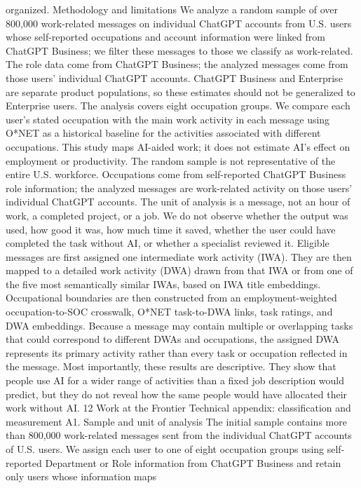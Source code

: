 organized.
Methodology and limitations
We analyze a random sample of over 800,000 work-related messages on individual ChatGPT accounts
from U.S. users whose self-reported occupations and account information were linked from ChatGPT
Business; we filter these messages to those we classify as work-related. The role data come from
ChatGPT Business; the analyzed messages come from those users’ individual ChatGPT accounts.
ChatGPT Business and Enterprise are separate product populations, so these estimates should not be
generalized to Enterprise users. The analysis covers eight occupation groups. We compare each user’s
stated occupation with the main work activity in each message using O*NET as a historical baseline for
the activities associated with different occupations.
This study maps AI-aided work; it does not estimate AI’s effect on employment or productivity. The
random sample is not representative of the entire U.S. workforce. Occupations come from self-reported
ChatGPT Business role information; the analyzed messages are work-related activity on those users’
individual ChatGPT accounts.
The unit of analysis is a message, not an hour of work, a completed project, or a job. We do not observe
whether the output was used, how good it was, how much time it saved, whether the user could have
completed the task without AI, or whether a specialist reviewed it.
Eligible messages are first assigned one intermediate work activity (IWA). They are then mapped
to a detailed work activity (DWA) drawn from that IWA or from one of the five most semantically
similar IWAs, based on IWA title embeddings. Occupational boundaries are then constructed from an
employment-weighted occupation-to-SOC crosswalk, O*NET task-to-DWA links, task ratings, and DWA
embeddings. Because a message may contain multiple or overlapping tasks that could correspond to
different DWAs and occupations, the assigned DWA represents its primary activity rather than every task
or occupation reflected in the message.
Most importantly, these results are descriptive. They show that people use AI for a wider range of
activities than a fixed job description would predict, but they do not reveal how the same people would
have allocated their work without AI.
12
Work at the Frontier
Technical appendix: classification and
measurement
A1. Sample and unit of analysis
The initial sample contains more than 800,000 work-related messages sent from the individual ChatGPT
accounts of U.S. users. We assign each user to one of eight occupation groups using self-reported
Department or Role information from ChatGPT Business and retain only users whose information maps

